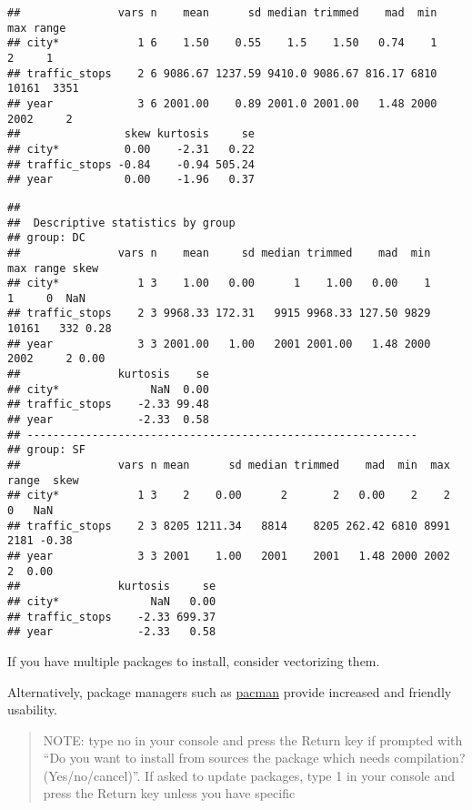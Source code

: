 \documentclass[
]{article}
\newenvironment{Shaded}{\begin{snugshade}}{\end{snugshade}}
\newcommand{\AttributeTok}[1]{\textcolor[rgb]{0.77,0.63,0.00}{#1}}
\newcommand{\CommentTok}[1]{\textcolor[rgb]{0.56,0.35,0.01}{\textit{#1}}}
\newcommand{\FunctionTok}[1]{\textcolor[rgb]{0.00,0.00,0.00}{#1}}
\newcommand{\NormalTok}[1]{#1}
\newcommand{\SpecialCharTok}[1]{\textcolor[rgb]{0.00,0.00,0.00}{#1}}
\begin{document}
\begin{verbatim}
##               vars n    mean      sd median trimmed    mad  min   max range
## city*            1 6    1.50    0.55    1.5    1.50   0.74    1     2     1
## traffic_stops    2 6 9086.67 1237.59 9410.0 9086.67 816.17 6810 10161  3351
## year             3 6 2001.00    0.89 2001.0 2001.00   1.48 2000  2002     2
##                skew kurtosis     se
## city*          0.00    -2.31   0.22
## traffic_stops -0.84    -0.94 505.24
## year           0.00    -1.96   0.37
\end{verbatim}

\begin{Shaded}
\end{Shaded}

\begin{verbatim}
## 
##  Descriptive statistics by group 
## group: DC
##               vars n    mean     sd median trimmed    mad  min   max range skew
## city*            1 3    1.00   0.00      1    1.00   0.00    1     1     0  NaN
## traffic_stops    2 3 9968.33 172.31   9915 9968.33 127.50 9829 10161   332 0.28
## year             3 3 2001.00   1.00   2001 2001.00   1.48 2000  2002     2 0.00
##               kurtosis    se
## city*              NaN  0.00
## traffic_stops    -2.33 99.48
## year             -2.33  0.58
## ------------------------------------------------------------ 
## group: SF
##               vars n mean      sd median trimmed    mad  min  max range  skew
## city*            1 3    2    0.00      2       2   0.00    2    2     0   NaN
## traffic_stops    2 3 8205 1211.34   8814    8205 262.42 6810 8991  2181 -0.38
## year             3 3 2001    1.00   2001    2001   1.48 2000 2002     2  0.00
##               kurtosis     se
## city*              NaN   0.00
## traffic_stops    -2.33 699.37
## year             -2.33   0.58
\end{verbatim}

If you have multiple packages to install, consider vectorizing them.

Alternatively, package managers such as
\href{http://trinker.github.io/pacman/vignettes/Introduction_to_pacman.html}{pacman}
provide increased and friendly usability.

\begin{quote}
NOTE: type no in your console and press the Return key if prompted with
``Do you want to install from sources the package which needs
compilation? (Yes/no/cancel)''. If asked to update packages, type 1 in
your console and press the Return key unless you have specific
\end{quote}
\end{document}
